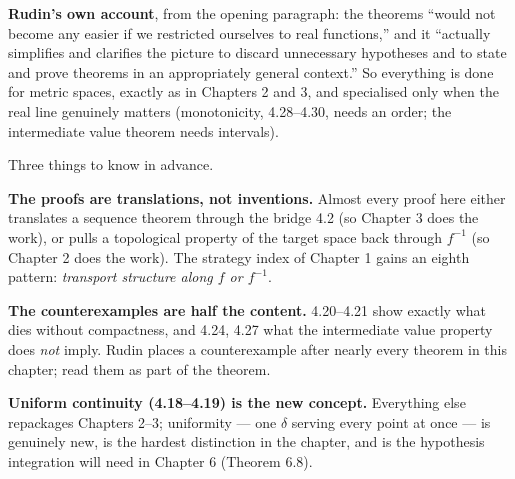 \begin{roadmap}
\textbf{Rudin's own account}, from the opening paragraph: the theorems ``would
not become any easier if we restricted ourselves to real functions,'' and it
``actually simplifies and clarifies the picture to discard unnecessary
hypotheses and to state and prove theorems in an appropriately general
context.'' So everything is done for metric spaces, exactly as in Chapters 2
and 3, and specialised only when the real line genuinely matters
(monotonicity, 4.28--4.30, needs an order; the intermediate value theorem
needs intervals).

\medskip
\centering
{}

\medskip
\raggedright
Three things to know in advance.

\smallskip
\textbf{The proofs are translations, not inventions.} Almost every proof here
either translates a sequence theorem through the bridge 4.2 (so Chapter 3 does
the work), or pulls a topological property of the target space back through
$f^{-1}$ (so Chapter 2 does the work). The strategy index of Chapter 1 gains
an eighth pattern: \emph{transport structure along $f$ or $f^{-1}$}.

\smallskip
\textbf{The counterexamples are half the content.} 4.20--4.21 show exactly
what dies without compactness, and 4.24, 4.27 what the intermediate value
property does \emph{not} imply. Rudin places a counterexample after nearly
every theorem in this chapter; read them as part of the theorem.

\smallskip
\textbf{Uniform continuity (4.18--4.19) is the new concept.} Everything else
repackages Chapters 2--3; uniformity --- one $\delta$ serving every point at
once --- is genuinely new, is the hardest distinction in the chapter, and is
the hypothesis integration will need in Chapter 6 (Theorem 6.8).
\end{roadmap}

